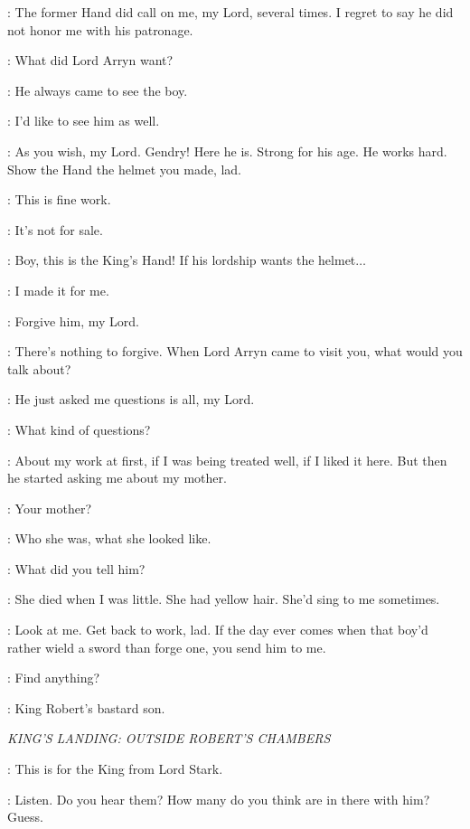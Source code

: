 \TOBHOMOTT: The former Hand did call on me, my Lord, several times. I regret to say he did not honor me with his patronage. 

\NED: What did Lord Arryn want? 

\TOBHOMOTT: He always came to see the boy. 

\NED: I'd like to see him as well. 

\TOBHOMOTT: As you wish, my Lord. Gendry! Here he is. Strong for his age. He works hard. Show the Hand the helmet you made, lad. 

\NED: This is fine work. 

\GENDRY: It's not for sale. 

\TOBHOMOTT: Boy, this is the King's Hand! If his lordship wants the helmet$\ldots$ 

\GENDRY: I made it for me. 

\TOBHOMOTT: Forgive him, my Lord. 

\NED: There's nothing to forgive. When Lord Arryn came to visit you, what would you talk about? 

\GENDRY: He just asked me questions is all, my Lord. 

\NED: What kind of questions? 

\GENDRY: About my work at first, if I was being treated well, if I liked it here. But then he started asking me about my mother. 

\NED: Your mother? 

\GENDRY: Who she was, what she looked like. 

\NED: What did you tell him? 

\GENDRY: She died when I was little. She had yellow hair. She'd sing to me sometimes. 

\NED: Look at me. Get back to work, lad. If the day ever comes when that boy'd rather wield a sword than forge one, you send him to me. 


\JORY: Find anything? 

\NED: King Robert's bastard son. 

\scene

\textit{KING'S LANDING: OUTSIDE ROBERT'S CHAMBERS}


\JORY: This is for the King from Lord Stark. 

\JAIME: Listen. Do you hear them? How many do you think are in there with him? Guess. 

